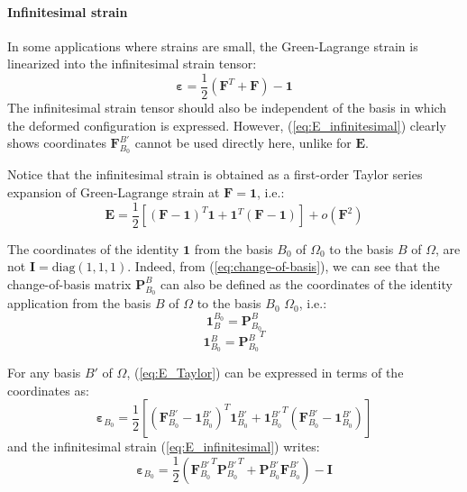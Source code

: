 \documentclass[letterpaper,12pt,oneside]{report}
\begin{document}
\paragraph{Infinitesimal strain} In some applications where strains are small, the Green-Lagrange strain is linearized into the infinitesimal strain tensor:
\begin{equation}
\boldsymbol{\varepsilon} = \frac{1}{2}\left(\mathbf{F}^T + \mathbf{F}\right) - \mathbf{1}
\label{eq:E_infinitesimal}
\end{equation}
The infinitesimal strain tensor should also be independent of the basis in which the deformed configuration is expressed. However, (\ref{eq:E_infinitesimal}) clearly shows coordinates $\mathbf{F}_{B_0}^{B'}$ cannot be used directly here, unlike for $\mathbf{E}$.

Notice that the infinitesimal strain is obtained as a first-order Taylor series expansion of Green-Lagrange strain at $\mathbf{F}=\mathbf{1}$, i.e.:
\begin{equation}
\mathbf{E} = \frac{1}{2}\left[(\mathbf{F}-\mathbf{1})^T \mathbf{1} + \mathbf{1}^T(\mathbf{F}-\mathbf{1})\right] + o(\mathbf{F}^2)
\label{eq:E_Taylor}
\end{equation}

The coordinates of the identity $\mathbf{1}$ from the basis $B_0$ of $\Omega_0$ to the basis $B$ of $\Omega$,  are not $\mathbf{I} = \mathrm{diag}(1,1,1)$. Indeed, from (\ref{eq:change-of-basis}), we can see that the change-of-basis matrix $\mathbf{P}_{B_0}^B$ can also be defined as the coordinates of the identity application from the basis $B$ of $\Omega$ to the basis $B_0$ $\Omega_0$, i.e.:
\begin{equation}
\mathbf{1}_{B}^{B_0} = \mathbf{P}_{B_0}^{B}
\end{equation}
\begin{equation}
\mathbf{1}_{B_0}^B = {\mathbf{P}_{B_0}^{B}}^T
\end{equation}

For any basis $B'$ of $\Omega$, (\ref{eq:E_Taylor}) can be expressed in terms of the coordinates as:
\begin{equation}
\boldsymbol{\varepsilon}_{B_0} = \frac{1}{2}\left[(\mathbf{F}_{B_0}^{B'}-\mathbf{1}_{B_0}^{B'})^T \mathbf{1}_{B_0}^{B'} + {\mathbf{1}_{B_0}^{B'}}^T(\mathbf{F}_{B_0}^{B'}-\mathbf{1}_{B_0}^{B'})\right]
\label{eq:epsilon_coordinates}
\end{equation}
and the infinitesimal strain (\ref{eq:E_infinitesimal}) writes:
\begin{equation}
\boldsymbol{\varepsilon}_{B_0} = \frac{1}{2}\left({\mathbf{F}_{B_0}^{B'}}^T {\mathbf{P}_{B_0}^{B'}}^T + \mathbf{P}_{B_0}^{B'} \mathbf{F}_{B_0}^{B'}\right) - \mathbf{I}
\end{equation}
\end{document}

